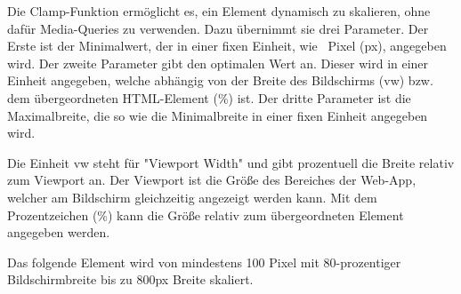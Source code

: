\label{sec:clamp}

Die Clamp-Funktion ermöglicht es, ein Element dynamisch zu skalieren, ohne dafür Media-Queries zu verwenden. 
Dazu übernimmt sie drei Parameter. 
Der Erste ist der Minimalwert, der in einer fixen Einheit, wie \zb\ Pixel ({\ttfamily px}), angegeben wird. 
Der zweite Parameter gibt den optimalen Wert an. 
Dieser wird in einer Einheit angegeben, welche abhängig von der Breite des Bildschirms ({\ttfamily vw}) bzw. dem übergeordneten HTML-Element ({\ttfamily \%}) ist. 
Der dritte Parameter ist die Maximalbreite, die so wie die Minimalbreite in einer fixen Einheit angegeben wird. 

Die Einheit {\ttfamily vw} steht für "Viewport Width" und gibt prozentuell die Breite relativ zum Viewport an. Der Viewport ist die Größe des Bereiches der Web-App, welcher am Bildschirm gleichzeitig angezeigt werden kann. 
Mit dem Prozentzeichen ({\ttfamily \%}) kann die Größe relativ zum übergeordneten Element angegeben werden.

Das folgende Element wird von mindestens 100 Pixel mit 80-prozentiger Bildschirmbreite bis zu 800px Breite skaliert.

